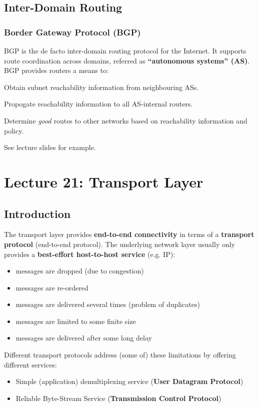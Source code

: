 \documentclass{article}%
\begin{document}
\subsection{Inter-Domain Routing}
\label{sec:org735079c}
\subsubsection{Border Gateway Protocol (BGP)}
\label{sec:org4186e5c}
BGP is the de facto inter-domain routing protocol for the Internet.
It supports route coordination across domains, referred as \textbf{``autonomous systems'' (AS)}.
BGP provides routers a means to:
\begin{description}
\item[{e(xternal)BGP}] Obtain subnet reachability information from neighbouring ASs.
\item[{i(nternal)BGP}] Propogate reachability information to all AS-internal routers.
\item Determine \emph{good} routes to other networks based on reachability information and policy.
\end{description}
See lecture slides for example.

\maketitle
\section{Lecture 21: Transport Layer}


\subsection{Introduction}
\label{sec:orgb58c24f}
The transport layer provides \textbf{end-to-end connectivity} in terms of a \textbf{transport protocol} (end-to-end protocol).
The underlying network layer usually only provides a \textbf{best-effort host-to-host service} (e.g. IP):
\begin{itemize}
\item messages are dropped (due to congestion)
\item messages are re-ordered
\item messages are delivered several times (problem of duplicates)
\item messages are limited to some finite size
\item messages are delivered after some long delay
\end{itemize}
Different transport protocols address (some of) these limitations by offering different services:
\begin{itemize}
\item Simple (application) demultiplexing service (\textbf{User Datagram Protocol})
\item Reliable Byte-Stream Service (\textbf{Transmission Control Protocol})
\end{itemize}
\end{document}

